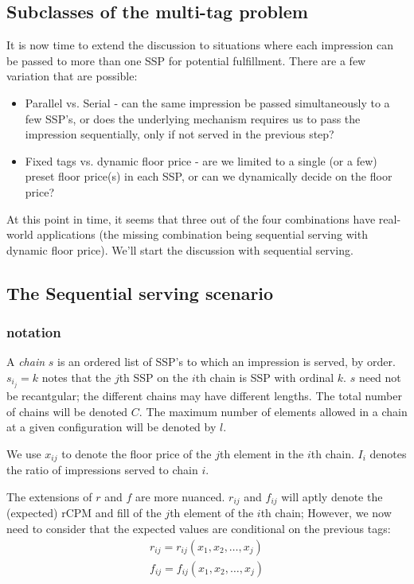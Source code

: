 \documentclass{article}
\begin{document}
\begin{large}
\subsection{Subclasses of the multi-tag problem}
It is now time to extend the discussion to situations where each impression can be passed to more than one SSP for potential fulfillment. There are a few variation that are possible:
\begin{itemize}
\item Parallel vs. Serial - can the same impression be passed simultaneously to a few SSP's, or does the underlying mechanism requires us to pass the impression sequentially, only if not served in the previous step?
\item Fixed tags vs. dynamic floor price - are we limited to a single (or a few) preset floor price(s) in each SSP, or can we dynamically decide on the floor price?
\end{itemize}
At this point in time, it seems that three out of the four combinations have real-world applications (the missing combination being sequential serving with dynamic floor price). We'll start the discussion with sequential serving.

\subsection{The Sequential serving scenario}
\subsubsection{notation}
A \emph{chain} $s$ is an ordered list of SSP's to which an impression is served, by order. $s_i_j=k$ notes that the $j$th SSP on the $i$th chain is SSP with ordinal $k$. $s$ need not be recantgular; the different chains may have different lengths. The total number of chains will be denoted $C$. The maximum number of elements allowed in a chain at a given configuration will be denoted by $l$.

We use $x_{ij}$ to denote the floor price of the $j$th element in the $i$th chain. $I_i$ denotes the ratio of impressions served to chain $i$.

The extensions of $r$ and $f$ are more nuanced. $r_{ij}$ and $f_{ij}$ will aptly denote the (expected) rCPM and fill of the $j$th element of the $i$th chain; However, we now need to consider that the expected values are conditional on the previous tags:
\begin{equation*}
\begin{aligned}
r_{ij}=r_{ij}(x_1,x_2,\dots,x_j)\\
f_{ij}=f_{ij}(x_1,x_2,\dots,x_j)
\end{aligned}
\end{equation*}


\end{large}
\end{document}
